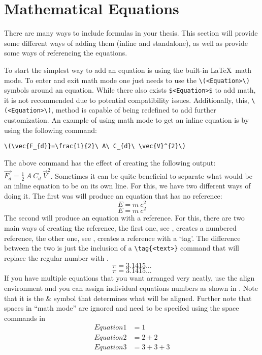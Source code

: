 \chapter{Mathematical Equations}
	There are many ways to include formulas in your thesis. 
	This section will provide some different ways of adding them (inline and standalone), as well as provide some ways of referencing the equations.

	To start the simplest way to add an equation is using the built-in \LaTeX\ math mode. 
	To enter and exit math mode one just needs to use the \lstinline|\(<Equation>\)| symbols around an equation. While there also exists \lstinline|$<Equation>$| to add math, it is not recommended due to potential compatibility issues. Additionally, this, \lstinline|\(<Equation>\)|, method is capable of being redefined to add further customization. 
	An example of using math mode to get an inline equation is by using the following command:

	\begin{Center}
		\lstinline|\(\vec{F_{d}}=\frac{1}{2}\ A\ C_{d}\ \vec{V}^{2}\)|
	\end{Center}

	The above command has the effect of creating the following output: \(\vec{F_{d}}=\frac{1}{2}\ A\ C_{d}\ \vec{V}^{2}\).
	Sometimes it can be quite beneficial to separate what would be an inline equation to be on its own line. 
	For this, we have two different ways of doing it. 
	The first was will produce an equation that has no reference:
	\[
		E = m\ c^2
	\] %
	\begin{equation*}
		E = m\ c^2
	\end{equation*}
	The second will produce an equation with a reference. 
	For this, there are two main ways of creating the reference, the first one, see , creates a numbered reference, the other one, see , creates a reference with a `tag'. 
	The difference between the two is just the inclusion of a \lstinline|\tag{<text>}| command that will replace the regular number with .
	\begin{equation}
		\label{eq:Eq}
		\pi = 3.1415...
	\end{equation}
	\begin{equation}
		\tag{Constant pi}
		\label{eq:customTag}
		\pi = 3.1415...
	\end{equation}
	If you have multiple equations that you want arranged very neatly, use the align environment and you can assign individual equations numbers as shown in .
	Note that it is the \& symbol that determines what will be aligned.
	Further note that spaces in \enquote{math mode} are ignored and need to be specifed using the space commands in %
	\begin{align}%
		\label{eq:multiref:a} Equation1 & = 1\\
		\label{eq:multiref:b} Equation2 & = 2 + 2\\
		\label{eq:multiref:c} Equation3 & = 3 + 3 + 3
	\end{align}
	
